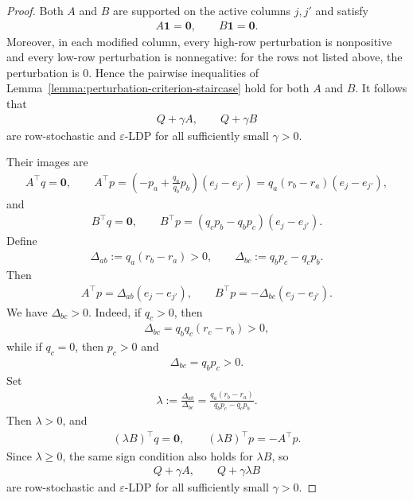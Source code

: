 \documentclass{article}
\theoremstyle{plain}
\theoremstyle{definition}
\theoremstyle{plain}
\begin{document}
\begin{proof}
Both $A$ and $B$ are supported on the active columns $j,j'$ and satisfy
\begin{align*}
    A\mathbf{1}=\mathbf{0},\qquad B\mathbf{1}=\mathbf{0}.
\end{align*}
Moreover, in each modified column, every high-row perturbation is nonpositive and every low-row perturbation is nonnegative: for the rows not listed above, the perturbation is $0$. Hence the pairwise inequalities of Lemma~\ref{lemma:perturbation-criterion-staircase} hold for both $A$ and $B$. It follows that
\begin{align*}
    Q+\gamma A,\qquad Q+\gamma B
\end{align*}
are row-stochastic and $\varepsilon$-LDP for all sufficiently small $\gamma>0$.

Their images are
\begin{align*}
    A^\top q=\mathbf{0},
    \qquad
    A^\top p
    =
    \left(-p_a+\frac{q_a}{q_b}p_b\right)(e_j-e_{j'})
    =
    q_a(r_b-r_a)(e_j-e_{j'}),
\end{align*}
and
\begin{align*}
    B^\top q=\mathbf{0},
    \qquad
    B^\top p
    =
    (q_c p_b-q_b p_c)(e_j-e_{j'}).
\end{align*}
Define
\begin{align*}
    \Delta_{ab}:=q_a(r_b-r_a)>0,
    \qquad
    \Delta_{bc}:=q_b p_c-q_c p_b.
\end{align*}
Then
\begin{align*}
    A^\top p=\Delta_{ab}(e_j-e_{j'}),
    \qquad
    B^\top p=-\Delta_{bc}(e_j-e_{j'}).
\end{align*}
We have $\Delta_{bc}>0$. Indeed, if $q_c>0$, then
\begin{align*}
    \Delta_{bc}
    =
    q_bq_c(r_c-r_b)>0,
\end{align*}
while if $q_c=0$, then $p_c>0$ and
\begin{align*}
    \Delta_{bc}=q_b p_c>0.
\end{align*}
Set
\begin{align*}
    \lambda:=\frac{\Delta_{ab}}{\Delta_{bc}}
    =
    \frac{q_a(r_b-r_a)}{q_b p_c-q_c p_b}.
\end{align*}
Then $\lambda>0$, and
\begin{align*}
    (\lambda B)^\top q=\mathbf{0},
    \qquad
    (\lambda B)^\top p=-A^\top p.
\end{align*}
Since $\lambda\ge 0$, the same sign condition also holds for $\lambda B$, so
\begin{align*}
    Q+\gamma A,\qquad Q+\gamma \lambda B
\end{align*}
are row-stochastic and $\varepsilon$-LDP for all sufficiently small $\gamma>0$.


\end{proof}
\end{document}
